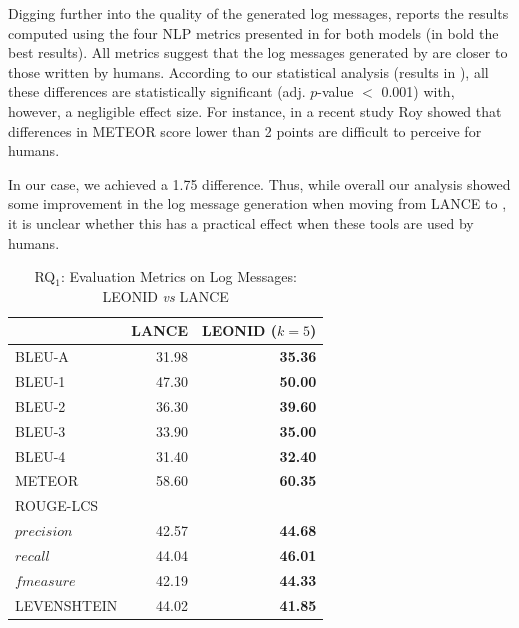 Digging further into the quality of the generated log messages,  reports the results computed using the four NLP metrics presented in  for both models (in bold the best results). All metrics suggest that the log messages generated by \approach are closer to those written by humans. According to our statistical analysis (results in \cite{replication}), all these differences are statistically significant (adj. $p$-value $<$ 0.001) with, however, a negligible effect size. For instance, in a recent study Roy \etal \cite{metricsImprovement} showed that differences in METEOR score lower than 2 points are difficult to perceive for humans. 

In our case, we achieved a 1.75 difference. Thus, while overall our analysis showed some improvement in the log message generation when moving from LANCE to \approach, it is unclear whether this has a practical effect when these tools are used by humans.

\begin{table}[h]
	\centering
	\caption{RQ$_1$: Evaluation Metrics on Log Messages: LEONID \emph{vs} LANCE\vspace{-0.3cm}}
	\scriptsize
	\label{tab:log-messages-stats}
	\begin{tabular}{lrr}
		\toprule
		& {\bf LANCE}  &  {\bf LEONID ($k=5$)} \\\midrule
		BLEU-A \cite{papineni2002bleu}& 31.98 & \bf 35.36\\
			\hspace{0.2cm} BLEU-1 & 47.30  & \bf 50.00\\
			\hspace{0.2cm} BLEU-2 & 36.30  & \bf 39.60\\
			\hspace{0.2cm} BLEU-3 & 33.90  & \bf 35.00\\
			\hspace{0.2cm} BLEU-4 & 31.40  & \bf 32.40\\
		METEOR \cite{meteor} & 58.60  & \bf 60.35 \\
		ROUGE-LCS \cite{lin2004rouge} &  \\
		\hspace{0.2cm} $precision$ & 42.57 & \bf 44.68\\
		\hspace{0.2cm} $recall$ & 44.04 &   \bf 46.01\\
		\hspace{0.2cm} $fmeasure$ & 42.19 &  \bf 44.33\\
		LEVENSHTEIN \cite{levenshtein1966} & 44.02 & \bf 41.85 \\\bottomrule
	\end{tabular} 
\end{table}


